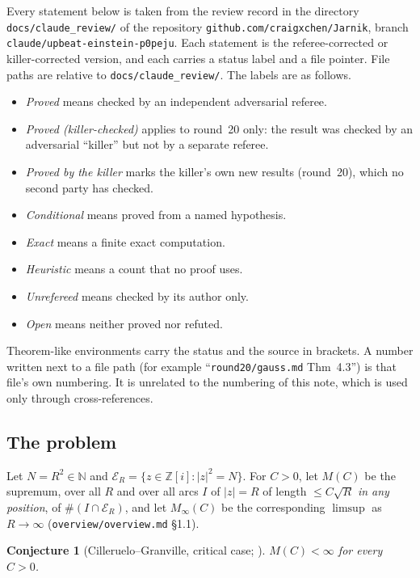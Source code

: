 \documentclass[11pt]{article}
\newtheorem{conjecture}{Conjecture}
\newcommand{\N}{\mathbb N}
\newcommand{\GI}{\mathbb Z[i]}
\newcommand{\E}{\mathcal E}
\newcommand{\rec}[1]{\texttt{#1}}
\begin{document}
Every statement below is taken from the review record in the directory
\rec{docs/claude\_review/} of the repository
\rec{github.com/craigxchen/Jarnik}, branch
\rec{claude/upbeat-einstein-p0peju}.  Each statement is the
referee-corrected or killer-corrected version, and each carries a status label
and a file pointer.  File paths are relative to \rec{docs/claude\_review/}.
The labels are as follows.
\begin{itemize}[leftmargin=2em]
  \item \emph{Proved} means checked by an independent adversarial referee.
  \item \emph{Proved (killer-checked)} applies to round~20 only: the result was
    checked by an adversarial ``killer'' but not by a separate referee.
  \item \emph{Proved by the killer} marks the killer's own new results
    (round~20), which no second party has checked.
  \item \emph{Conditional} means proved from a named hypothesis.
  \item \emph{Exact} means a finite exact computation.
  \item \emph{Heuristic} means a count that no proof uses.
  \item \emph{Unrefereed} means checked by its author only.
  \item \emph{Open} means neither proved nor refuted.
\end{itemize}
Theorem-like environments carry the status and the source in brackets.  A
number written next to a file path (for example ``\rec{round20/gauss.md}
Thm~4.3'') is that file's own numbering.  It is unrelated to the numbering of
this note, which is used only through cross-references.

\subsection{The problem}

Let \(N=R^2\in\N\) and \(\E_R=\{z\in\GI:|z|^2=N\}\).  For \(C>0\), let
\(M(C)\) be the supremum, over all \(R\) and over all arcs \(I\) of \(|z|=R\)
of length \(\le C\sqrt R\) \emph{in any position}, of \(\#(I\cap\E_R)\), and
let \(M_\infty(C)\) be the corresponding \(\limsup\) as \(R\to\infty\)
(\rec{overview/overview.md} \S1.1).

\begin{conjecture}[Cilleruelo--Granville, critical case; \cite{CillerueloGranville2007,CillerueloGranville2009}]\label{conj:CG}
\(M(C)<\infty\) for every \(C>0\).
\end{conjecture}
\end{document}
